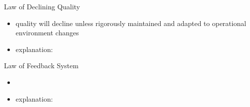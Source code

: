 \begin{frame}{\insertsubsection}
	\begin{fancycolumns}
		\begin{definition}{Law of Declining Quality\mysource{\lehmanslaws}}
			\begin{itemize}
				\item quality will decline unless rigorously maintained and adapted to operational environment changes %
				\item explanation: 
			\end{itemize}
		\end{definition}
		\begin{example}{}
		\end{example}
		\nextcolumn
		\begin{definition}{Law of Feedback System\mysource{\lehmanslaws}}
			\begin{itemize}
				\item %
				\item explanation: 
			\end{itemize}
		\end{definition}
		\begin{example}{}
		\end{example}
	\end{fancycolumns}
\end{frame}


